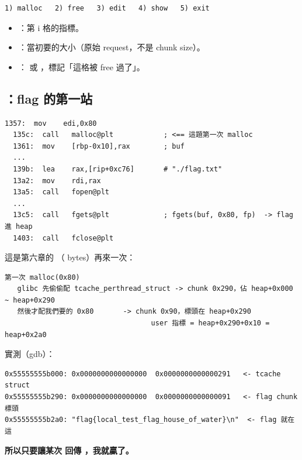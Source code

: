 \begin{lstlisting}[style=raw]
1) malloc   2) free   3) edit   4) show   5) exit
\end{lstlisting}

\begin{itemize}[leftmargin=1.4em,itemsep=1pt]
  \item {}：第 i 格的指標。
  \item {}：當初要的大小（原始 request，不是 chunk size）。
  \item {}： 或 ，標記「這格被 free 過了」。
\end{itemize}

\subsection{：flag 的第一站}

\begin{lstlisting}[style=asm]
  1357:  mov    edi,0x80
  135c:  call   malloc@plt            ; <== 這題第一次 malloc
  1361:  mov    [rbp-0x10],rax        ; buf
  ...
  139b:  lea    rax,[rip+0xc76]       # "./flag.txt"
  13a2:  mov    rdi,rax
  13a5:  call   fopen@plt
  ...
  13c5:  call   fgets@plt             ; fgets(buf, 0x80, fp)  -> flag 進 heap
  1403:  call   fclose@plt
\end{lstlisting}

\begin{keybox}
這是第六章的 （ bytes）再來一次：

\begin{lstlisting}[style=raw]
第一次 malloc(0x80)
   glibc 先偷偷配 tcache_perthread_struct -> chunk 0x290，佔 heap+0x000 ~ heap+0x290
   然後才配我們要的 0x80       -> chunk 0x90，標頭在 heap+0x290
                                   user 指標 = heap+0x290+0x10 = heap+0x2a0
\end{lstlisting}

實測（gdb）：

\begin{lstlisting}[style=raw]
0x55555555b000: 0x0000000000000000  0x0000000000000291   <- tcache struct
0x55555555b290: 0x0000000000000000  0x0000000000000091   <- flag chunk 標頭
0x55555555b2a0: "flag{local_test_flag_house_of_water}\n"  <- flag 就在這
\end{lstlisting}

\textbf{所以只要讓某次  回傳 ，我就贏了。}
\end{keybox}

